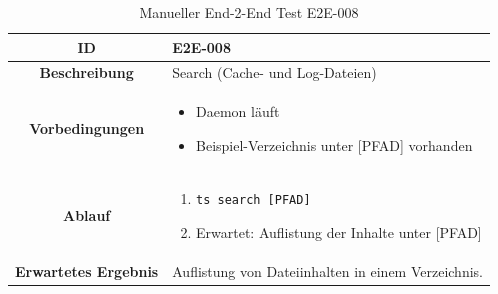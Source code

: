 \documentclass[a4paper,12pt]{report}
\begin{document}
    \begin{table}[h!]
        \centering
        \setlength{\leftmargini}{0.8cm}
        \begin{tabular}{|c|p{10cm}|}
            \hline
            \textbf{ID}           & E2E-008                                                                 \\ \hline
            \textbf{Beschreibung} & Search (Cache- und Log-Dateien)         \\ \hline
            \textbf{Vorbedingungen} &
            \begin{itemize}
                \item Daemon läuft
                \item Beispiel-Verzeichnis unter [PFAD] vorhanden
            \end{itemize} \\ \hline
            \textbf{Ablauf} &
            \begin{enumerate}
                \item \begin{verbatim}ts search [PFAD]\end{verbatim}
                \item Erwartet: Auflistung der Inhalte unter [PFAD]
            \end{enumerate} \\ \hline
            \textbf{Erwartetes Ergebnis} & Auflistung von Dateiinhalten in einem Verzeichnis. \\ \hline
        \end{tabular}
        \caption{Manueller End-2-End Test E2E-008}\label{tab:e2e-8}
    \end{table}
\end{document}
